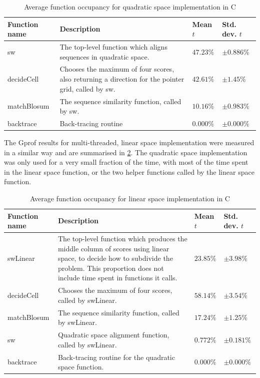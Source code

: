 \begin{table}
    \centering
    \begin{tabular}{|p{}|p{}p{}p{}|} \hline
        Function name & Description & Mean $t$ & Std. dev. $t$ \\ \hline
        {\ttfamily sw} & The top-level function which aligns sequences in quadratic space. & $47.23\%$ & $\pm0.886\%$ \\ \hline
        {\ttfamily decideCell} & Chooses the maximum of four scores, also returning a direction for the pointer grid, called by {\ttfamily sw}. & $42.61\%$ & $\pm1.45\%$ \\ \hline
        {\ttfamily matchBlosum} & The sequence similarity function, called by {\ttfamily sw}. & $10.16\%$ & $\pm0.983\%$ \\ \hline
        {\ttfamily backtrace} & Back-tracing routine & $0.000\%$ & $\pm0.000\%$ \\ \hline
    \end{tabular}

    \caption{Average function occupancy for quadratic space implementation in C}
    \label{tab:C_Quadratic_Occupancy}
\end{table}

The Gprof results for multi-threaded, linear space implementation were measured in a similar way and are summarised in \cref{tab:C_Linear_Occupancy}.
The quadratic space implementation was only used for a very small fraction of the time, with most of the time spent in the linear space function, or the two helper functions called by the linear space function.

\begin{table}
    \centering
    \begin{tabular}{|p{}|p{}p{}p{}|} \hline
        Function name & Description & Mean $t$ & Std. dev. $t$ \\ \hline
        {\ttfamily swLinear} & The top-level function which produces the middle column of scores using linear space, to decide how to subdivide the problem. This proportion does not include time spent in functions it calls. & $23.85\%$ & $\pm3.98\%$ \\ \hline
        {\ttfamily decideCell} & Chooses the maximum of four scores, called by {\ttfamily swLinear}. & $58.14\%$ & $\pm3.54\%$ \\ \hline
        {\ttfamily matchBlosum} & The sequence similarity function, called by {\ttfamily swLinear}. & $17.24\%$ & $\pm1.25\%$ \\ \hline
        {\ttfamily sw} & Quadratic space alignment function, called by {\ttfamily swLinear}. & $0.772\%$ & $\pm0.181\%$\\ \hline
        {\ttfamily backtrace} & Back-tracing routine for the quadratic space function. & $0.000\%$ & $\pm0.000\%$ \\ \hline
    \end{tabular}

    \caption{Average function occupancy for linear space implementation in C}
    \label{tab:C_Linear_Occupancy}
\end{table}

